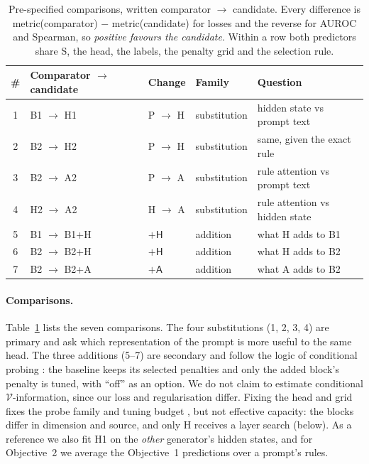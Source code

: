 \documentclass{article}
\newcommand{\blk}[1]{\textsf{#1}}
\newcommand{\cto}{$\rightarrow$}
\begin{document}
\begin{table}[t]
\centering\small
\caption{Pre-specified comparisons, written comparator \cto{} candidate. Every difference is
metric(comparator) $-$ metric(candidate) for losses and the reverse for AUROC and Spearman, so \emph{positive favours
the candidate}. Within a row both predictors share \blk{S}, the head, the labels, the penalty grid and the selection
rule.}
\label{tab:predictors}
\setlength{\tabcolsep}{4pt}
\begin{tabular}{cllll}
\toprule
\# & Comparator \cto{} candidate & Change & Family & Question \\
\midrule
1 & B1 \cto{} H1 & \blk{P} \cto{} \blk{H} & substitution & hidden state vs prompt text \\
2 & B2 \cto{} H2 & \blk{P} \cto{} \blk{H} & substitution & same, given the exact rule \\
3 & B2 \cto{} A2 & \blk{P} \cto{} \blk{A} & substitution & rule attention vs prompt text \\
4 & H2 \cto{} A2 & \blk{H} \cto{} \blk{A} & substitution & rule attention vs hidden state \\
\midrule
5 & B1 \cto{} B1+H & $+\blk{H}$ & addition & what \blk{H} adds to B1 \\
6 & B2 \cto{} B2+H & $+\blk{H}$ & addition & what \blk{H} adds to B2 \\
7 & B2 \cto{} B2+A & $+\blk{A}$ & addition & what \blk{A} adds to B2 \\
\bottomrule
\end{tabular}
\end{table}

\paragraph{Comparisons.} Table~\ref{tab:predictors} lists the seven comparisons. The four substitutions (1, 2, 3, 4) are
primary and ask which representation of the prompt is more useful to the same head. The three additions (5--7) are
secondary and follow the logic of conditional probing \citep{hewitt2021conditional}: the baseline keeps its selected
penalties and only the added block's penalty is tuned, with ``off'' as an option. We do not claim to estimate
conditional $\mathcal{V}$-information, since our loss and regularisation differ. Fixing the head and grid fixes the probe
family and tuning budget \citep{hewitt2019control}, but not effective capacity: the blocks differ in dimension and
source, and only \blk{H} receives a layer search (below). As a reference we also fit H1 on the \emph{other} generator's hidden states,
and for Objective~2 we average the Objective~1 predictions over a prompt's rules.
\end{document}
